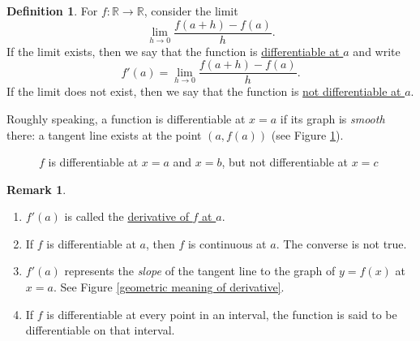 \documentclass[12pt,letterpaper]{book}
\numberwithin{equation}{section}
\theoremstyle{definition}
\newtheorem{defi}[thm]{\textbf{Definition}}
\newtheorem{remark}[thm]{\textbf{Remark}}
\begin{document}
\begin{defi} For $f:\mathbb{R}\to \mathbb{R}$, consider the limit
$$\lim_{h\to 0}\frac{f(a+h)-f(a)}{h}.$$
If the limit exists, then we say that the function is \underline{differentiable at $a$} and write $$f'(a)=\lim_{h\to 0}\frac{f(a+h)-f(a)}{h}.$$ If the limit does not exist, then we say that the function is \underline{not differentiable at $a$}.
\end{defi}

Roughly speaking, a function is differentiable at $x=a$ if its graph is \textit{smooth} there: a tangent line exists at the point $(a,f(a))$ (see Figure \ref{not diff at a}).

\begin{figure}[h]
\begin{center}
\end{center}
\caption{$f$ is differentiable at $x=a$ and $x=b$, but not differentiable at $x=c$}
\label{not diff at a}
\end{figure}

\begin{remark}\quad
\begin{enumerate}
\item $f'(a)$ is called the \underline{derivative of $f$ at $a$}.
\item If $f$ is differentiable at $a$, then $f$ is continuous at $a$. The converse is not true.
\item $f'(a)$ represents the \textit{slope} of the tangent line to the graph of $y=f(x)$ at $x=a$. See Figure \ref{geometric meaning of derivative}.
\item If $f$ is differentiable at every point in an interval, the function is said to be differentiable on that interval.
\end{enumerate}
\end{remark}
\end{document}
